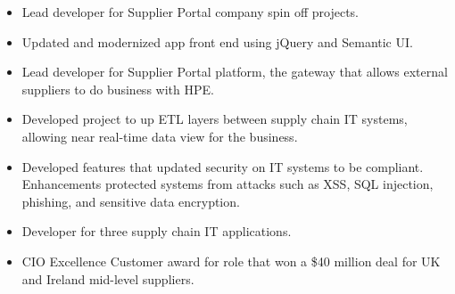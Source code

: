 \documentclass[10pt,a4paper]{resume}
\begin{document}
\divider

\begin{itemize}
\item Lead developer for Supplier Portal company spin off projects.
\item Updated and modernized app front end using jQuery and Semantic UI.
\end{itemize}

\divider

\begin{itemize}
\item Lead developer for Supplier Portal platform, the gateway that allows external suppliers to do business with HPE.
\item Developed project to up ETL layers between supply chain IT systems, allowing near real-time data view for the business.
\item Developed features that updated security on IT systems to be compliant. Enhancements protected systems from attacks such as XSS, SQL injection, phishing, and sensitive data encryption.
\end{itemize}

\divider

\begin{itemize}
\item Developer for three supply chain IT applications.
\item CIO Excellence Customer award for role that won a \$40 million deal for UK and Ireland mid-level suppliers.

\end{itemize}


\clearpage

\end{document}

